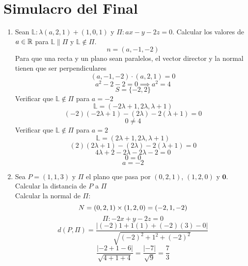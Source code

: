 \documentclass[../practica.root.tex]{subfiles}
\begin{document}
\section{Simulacro del Final}

\begin{enumerate}
    \item Sean $\mathbb{L} : \lambda(a, 2, 1) + (1,0,1)$ y $\Pi : ax - y - 2z = 0$. Calcular los valores de $a \in \mathbb{R}$ para $\mathbb{L} \parallel \Pi$ y $\mathbb{L} \notin \Pi$.
          \[ n = (a,-1,-2) \]
          Para que una recta y un plano sean paralelos, el vector director y la normal tienen que ser perpendiculares
          \[ (a,-1,-2)\cdot(a,2,1) = 0 \]
          \[ a^2 -2 -2 = 0 \implies a^2 = 4 \]
          \[ S = \{-2, 2\} \]
          Verificar que $\mathbb{L}\notin\Pi$ para $a = -2$
          \[ \mathbb{L} = (-2\lambda + 1, 2\lambda, \lambda + 1) \]
          \[ (-2)(-2\lambda + 1) - (2\lambda) - 2(\lambda + 1) = 0 \]
          \[ 0 \neq 4 \]
          Verificar que $\mathbb{L}\notin\Pi$ para $a = 2$
          \[ \mathbb{L} = (2\lambda + 1, 2\lambda, \lambda + 1) \]
          \[ (2)(2\lambda + 1) - (2\lambda) - 2(\lambda + 1) = 0 \]
          \[ 4\lambda + 2 - 2\lambda - 2\lambda - 2 = 0 \]
          \[ 0 = 0 \]
          \[ \boxed{a = -2} \]

    \item Sea $P = (1,1,3)$ y $\Pi$ el plano que pasa por $(0,2,1)$, $(1,2,0)$ y $\mathbf{0}$. Calcular la distancia de $P$ a $\Pi$ \\
          Calcular la normal de $\Pi$:
          \[ N = (0,2,1)\times(1,2,0) = (-2,1,-2) \]
          \[ \Pi : -2x + y - 2z = 0\]
          \[
              d(P,\Pi) = \frac{
                  | (-2)1 +1(1) + (-2)(3) - 0 |
              }{
                  \sqrt{(-2)^2 + 1^2 + (-2)^2}
              }
          \] \[
              \frac{
                  | -2 +1 -6 |
              }{
                  \sqrt{4 + 1 + 4}
              } = \frac{
                  | -7 |
              }{
                  \sqrt{9}
              } = \boxed{\frac{
                      7
                  }{
                      3
                  }}
          \]


\end{enumerate}
\end{document}
